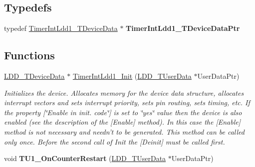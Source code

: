 \subsection*{Typedefs}
\begin{DoxyCompactItemize}
\item 
\hypertarget{group___timer_int_ldd1__module_ga24d5bad052ceefb0ed97378c80c8dc03}{typedef \hyperlink{struct_timer_int_ldd1___t_device_data}{Timer\-Int\-Ldd1\-\_\-\-T\-Device\-Data} $\ast$ {\bfseries Timer\-Int\-Ldd1\-\_\-\-T\-Device\-Data\-Ptr}}\label{group___timer_int_ldd1__module_ga24d5bad052ceefb0ed97378c80c8dc03}

\end{DoxyCompactItemize}
\subsection*{Functions}
\begin{DoxyCompactItemize}
\item 
\hyperlink{group___p_e___types__module_gac5cf1362f1f0e3a2ce71b1bf2276d091}{L\-D\-D\-\_\-\-T\-Device\-Data} $\ast$ \hyperlink{group___timer_int_ldd1__module_ga069f7459fc74e21fb9bcceadbe7cb9cb}{Timer\-Int\-Ldd1\-\_\-\-Init} (\hyperlink{group___p_e___types__module_ga0b66a73f87238a782318aa0be7578e35}{L\-D\-D\-\_\-\-T\-User\-Data} $\ast$User\-Data\-Ptr)
\begin{DoxyCompactList}\small\item\em Initializes the device. Allocates memory for the device data structure, allocates interrupt vectors and sets interrupt priority, sets pin routing, sets timing, etc. If the property \mbox{[}\char`\"{}\-Enable in init. code\char`\"{}\mbox{]} is set to \char`\"{}yes\char`\"{} value then the device is also enabled (see the description of the \mbox{[}Enable\mbox{]} method). In this case the \mbox{[}Enable\mbox{]} method is not necessary and needn't to be generated. This method can be called only once. Before the second call of Init the \mbox{[}Deinit\mbox{]} must be called first. \end{DoxyCompactList}\item 
\hypertarget{group___timer_int_ldd1__module_ga915c714e97fd2a66385fddc37d45352a}{void {\bfseries T\-U1\-\_\-\-On\-Counter\-Restart} (\hyperlink{group___p_e___types__module_ga0b66a73f87238a782318aa0be7578e35}{L\-D\-D\-\_\-\-T\-User\-Data} $\ast$User\-Data\-Ptr)}\label{group___timer_int_ldd1__module_ga915c714e97fd2a66385fddc37d45352a}

\end{DoxyCompactItemize}


